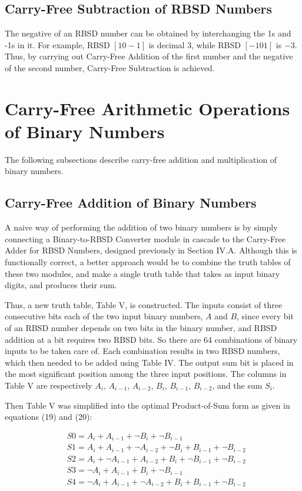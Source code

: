 \documentclass[conference]{IEEEtran}
\begin{document}
\subsection{Carry-Free Subtraction of RBSD Numbers}

The negative of an RBSD number can be obtained by interchanging the 1s and -1s in it. For example, RBSD $[1 0 -1]$ is decimal $3$, while RBSD $[-1 0 1]$ is $-3$. Thus, by carrying out Carry-Free Addition of the first number and the negative of the second number, Carry-Free Subtraction is achieved.

\section{Carry-Free Arithmetic Operations of Binary Numbers}

The following subsections describe carry-free addition and multiplication of binary numbers.

\subsection{Carry-Free Addition of Binary Numbers}

A naive way of performing the addition of two binary numbers is by simply connecting a Binary-to-RBSD Converter module in cascade to the Carry-Free Adder for RBSD Numbers, designed previously in Section IV.A. Although this is functionally correct, a better approach would be to combine the truth tables of these two modules, and make a single truth table that takes as input binary digits, and produces their sum.

Thus, a new truth table, Table V, is constructed. The inputs consist of three consecutive bits each of the two input binary numbers, $A$ and $B$, since every bit of an RBSD number depends on two bits in the binary number, and RBSD addition at a bit requires two RBSD bits. So there are 64 combinations of binary inputs to be taken care of. Each combination results in two RBSD numbers, which then needed to be added using Table IV. The output sum bit is placed in the most significant position among the three input positions. The columns in Table V are respectively $A_{i}$, $A_{i-1}$, $A_{i-2}$, $B_{i}$, $B_{i-1}$, $B_{i-2}$, and the sum $S_{i}$.

Then Table V was simplified into the optimal Product-of-Sum form as given in equations (19) and (20):

\vspace{-1em}
\begin{align}
&S0 = A_{i} + A_{i-1} + \neg  B_{i} + \neg B_{i-1}\\
&S1 = A_{i} + A_{i-1} + \neg A_{i-2} + \neg B_{i} + B_{i-1} + \neg B_{i-2}\\
&S2 = A_{i} + \neg A_{i-1} + A_{i-2} + B_{i} + \neg B_{i-1} + \neg B_{i-2}\\
&S3 = \neg A_{i} + A_{i-1}   + B_{i} + \neg B_{i-1}\\
&S4 = \neg A_{i} + A_{i-1} + \neg A_{i-2} + B_{i} + B_{i-1} + \neg B_{i-2}
\end{align}
\end{document}
